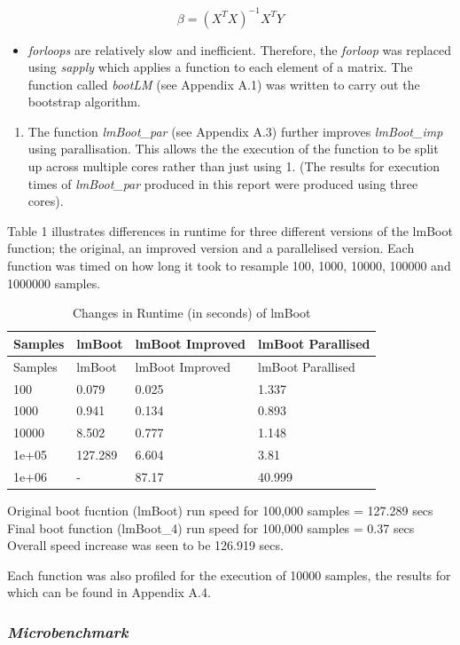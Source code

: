 \documentclass[]{article}
\providecommand{\tightlist}{%
  \setlength{\itemsep}{0pt}\setlength{\parskip}{0pt}}
\begin{document}
\[
\beta = (X^TX)^{-1}X^TY
\]

\begin{itemize}
\tightlist
\item
  \emph{forloops} are relatively slow and inefficient. Therefore, the
  \emph{forloop} was replaced using \emph{sapply} which applies a
  function to each element of a matrix. The function called
  \emph{bootLM} (see Appendix A.1) was written to carry out the
  bootstrap algorithm.
\end{itemize}

\begin{enumerate}
\def\labelenumi{\arabic{enumi}.}
\setcounter{enumi}{1}
\tightlist
\item
  The function \emph{lmBoot\_par} (see Appendix A.3) further improves
  \emph{lmBoot\_imp} using parallisation. This allows the the execution
  of the function to be split up across multiple cores rather than just
  using 1. (The results for execution times of \emph{lmBoot\_par}
  produced in this report were produced using three cores).
\end{enumerate}

Table 1 illustrates differences in runtime for three different versions
of the lmBoot function; the original, an improved version and a
parallelised version. Each function was timed on how long it took to
resample 100, 1000, 10000, 100000 and 1000000 samples.

\begin{longtable}[]{@{}llll@{}}
\caption{Changes in Runtime (in seconds) of lmBoot}\tabularnewline
\toprule
Samples & lmBoot & lmBoot Improved & lmBoot Parallised\tabularnewline
\midrule
\endfirsthead
\toprule
Samples & lmBoot & lmBoot Improved & lmBoot Parallised\tabularnewline
\midrule
\endhead
100 & 0.079 & 0.025 & 1.337\tabularnewline
1000 & 0.941 & 0.134 & 0.893\tabularnewline
10000 & 8.502 & 0.777 & 1.148\tabularnewline
1e+05 & 127.289 & 6.604 & 3.81\tabularnewline
1e+06 & - & 87.17 & 40.999\tabularnewline
\bottomrule
\end{longtable}

Original boot fucntion (lmBoot) run speed for 100,000 samples = 127.289
secs Final boot function (lmBoot\_4) run speed for 100,000 samples =
0.37 secs Overall speed increase was seen to be 126.919 secs.

Each function was also profiled for the execution of 10000 samples, the
results for which can be found in Appendix A.4.

\subsubsection{\texorpdfstring{\emph{Microbenchmark}}{Microbenchmark}}\label{microbenchmark}
\end{document}
